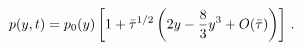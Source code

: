 \begin{equation}
p(y,t) = p_0(y) \left[ 1 + {\bar\tau}^{1/2}\left( 2y - {8\over 3}y^3 +
                O({\bar\tau})\right) \right] \, .
\label{eq18}
\end{equation}

